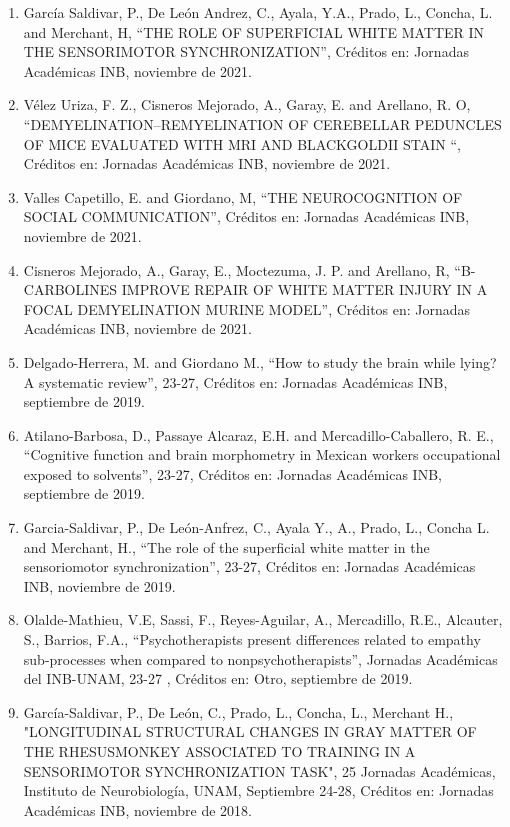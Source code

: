 \begin{enumerate}
\item García Saldivar, P., De León Andrez, C., Ayala, Y.A., Prado, L., Concha, L. and Merchant, H, “THE ROLE OF SUPERFICIAL WHITE MATTER IN THE SENSORIMOTOR 
SYNCHRONIZATION”, Créditos en: Jornadas Académicas INB, noviembre de 2021.

\item Vélez Uriza, F. Z., Cisneros Mejorado, A., Garay, E. and Arellano, R. O, “DEMYELINATION–REMYELINATION OF CEREBELLAR PEDUNCLES OF MICE EVALUATED WITH MRI 
AND 
BLACKGOLDII STAIN “, Créditos en: Jornadas Académicas INB, noviembre de 2021.

\item Valles Capetillo, E. and Giordano, M, “THE NEUROCOGNITION OF SOCIAL COMMUNICATION”, Créditos en: Jornadas Académicas INB, noviembre de 2021.

\item Cisneros Mejorado, A., Garay, E., Moctezuma, J. P. and Arellano, R, “B-CARBOLINES IMPROVE REPAIR OF WHITE MATTER INJURY IN A FOCAL DEMYELINATION MURINE 
MODEL”, 
Créditos en: Jornadas Académicas INB, noviembre de 2021.

\item Delgado-Herrera, M. and Giordano M., “How to study the brain while lying? A systematic review”, 23-27, Créditos en: Jornadas Académicas INB, septiembre de 
2019.

\item Atilano-Barbosa, D., Passaye Alcaraz, E.H. and Mercadillo-Caballero, R. E., “Cognitive function and brain morphometry in Mexican workers occupational 
exposed to 
solvents”, 23-27, Créditos en: Jornadas Académicas INB, septiembre de 2019.

\item Garcia-Saldivar, P., De León-Anfrez, C., Ayala Y., A., Prado, L., Concha L. and Merchant, H., “The role of the superficial white matter in the 
sensoriomotor 
synchronization”, 23-27, Créditos en: Jornadas Académicas INB, noviembre de 2019.

\item Olalde-Mathieu, V.E, Sassi, F., Reyes-Aguilar, A., Mercadillo, R.E., Alcauter, S., Barrios, F.A., “Psychotherapists present differences related to empathy 
sub-processes when compared to nonpsychotherapists”, Jornadas Académicas del INB-UNAM, 23-27 , Créditos en: Otro, septiembre de 2019.

\item García-Saldivar, P., De León, C., Prado, L., Concha, L., Merchant H., "LONGITUDINAL STRUCTURAL CHANGES IN GRAY MATTER OF THE RHESUSMONKEY ASSOCIATED TO 
TRAINING 
IN A SENSORIMOTOR SYNCHRONIZATION TASK", 25 Jornadas Académicas, Instituto de Neurobiología, UNAM, Septiembre 24-28, Créditos en: Jornadas Académicas INB, 
noviembre de 2018.


\end{enumerate}
